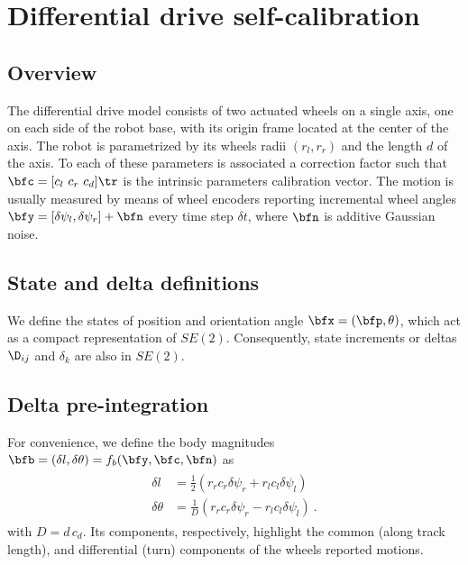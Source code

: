 
\section{Differential drive self-calibration}
\label{sec:diff_drive}

\subsection{Overview}

The differential drive model consists of two actuated wheels on a single axis, one on each side of the robot base,
with its origin frame located at the center of the axis.
The robot is parametrized by
its wheels radii $(r_l, r_r)$ and the length $d$ of the axis.
To each of these parameters is associated a correction factor such that
$\bfc=[c_l~c_r~c_d]\tr$ is the intrinsic parameters calibration vector.
%
The motion is usually measured by means of wheel encoders reporting incremental wheel angles $\bfy=[\delta\psi_l, \delta\psi_r]+\bfn$ 
every time step $\delta t$, where $\bfn$ is additive Gaussian noise.


\subsection{State and delta definitions}
%
We define the states of position and orientation angle
$\bfx = (\bfp,\theta)$, which act as a compact representation of $SE(2)$.
Consequently, state increments or deltas $\D_{ij}$ and $\delta_k$ are also in $SE(2)$.


%
\subsection{Delta pre-integration}

For convenience, we define the body magnitudes 
$\bfb = (\delta l,\delta \theta)=f_b(\bfy,\bfc,\bfn)$ as
%
%
\begin{align}
\label{equ:diff_drive_psis}
\begin{split}
\delta l &= \tfrac12(r_r c_r \delta\psi_r + r_l c_l\delta\psi_l)  \\
\delta \theta &= \tfrac{1}{D}(r_r c_r \delta\psi_r - r_l c_l\delta\psi_l) 
~.
\end{split}
\end{align}
%
with $D=d\,c_d$. 
Its components, respectively, highlight the common (along track length), and differential (turn) components of the wheels reported motions.

